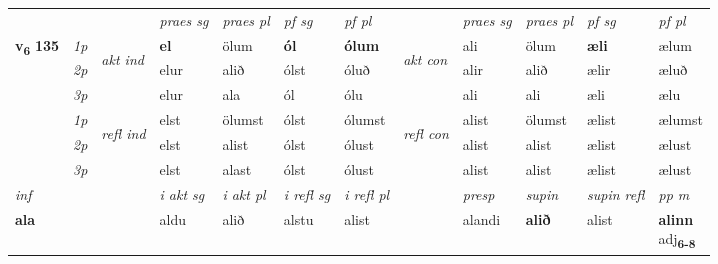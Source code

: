 \begin{longtable}[l]{X>{\footnotesize\itshape}llXXXXlXXXX}
 & &   & \textit{praes sg}  & \textit{praes pl}    & \textit{ pf sg} & \textit{pf pl} & & \textit{praes sg}  & \textit{praes pl}    & \textit{pf sg} & \textit{pf pl }  \\ \cmidrule{4-7} \cmidrule{9-12}
 \multirow{2}{*}{{{\textbf{v{\textsubscript{6}}} \Large{\textbf{135}}}}}  & 1p & \multirow{3}{*}{\begin{turn}{90}\textit{akt ind}\end{turn}} & \textbf{el} & ölum & \textbf{ól} & \textbf{ólum} & \multirow{3}{*}{\begin{turn}{90}\textit{akt con}\end{turn}} &ali & ölum & \textbf{æli} & ælum\\*
 & 2p &  &  elur  & alið & ólst & óluð & & alir & alið & ælir & æluð \\*
 & 3p &  & elur & ala & ól & ólu & & ali & ali& æli & ælu \\*
\cmidrule{4-7} \cmidrule{9-12}
 & 1p & \multirow{3}{*}{\begin{turn}{90}\textit{refl ind}\end{turn}}  & elst & ölumst & ólst & ólumst & \multirow{3}{*}{\begin{turn}{90}\textit{refl con}\end{turn}}  &alist & ölumst & ælist & ælumst \\*
 & 2p &  & elst & alist & ólst & ólust & &alist & alist & ælist & ælust \\*
 & 3p  & & elst & alast & ólst & ólust & & alist & alist& ælist & ælust \\*
\cmidrule{4-7} \cmidrule{9-12}

   {\textit{inf}} & &  & \textit{i akt sg} & \textit{i akt pl} & \textit{i refl sg} & \textit{i refl pl} && \textit{presp} & \textit{supin} & \textit{supin refl} & \textit{pp m} \\*
  {\textbf{ala}} & && aldu  & alið & alstu & alist && alandi &  \textbf{alið} & alist & \specialcell{\textbf{alinn} \\ adj\textbf{\textsubscript{6-8}}} \\*

\midrule


\end{longtable}

